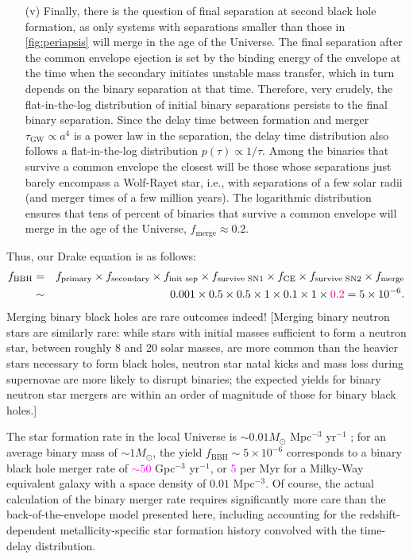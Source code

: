 \documentclass[iop,onecolumn]{revtex4}
\newcommand{\ilya}[1]{\textcolor{magenta}{#1}}
\begin{document}
\begin{enumerate}
\item[(v)]  Finally, there is the question of final separation at second black hole formation, as only systems with separations smaller than those in \autoref{fig:periapsis} will merge in the age of the Universe.  The final separation after the common envelope ejection is set by the binding energy of the envelope at the time when the secondary initiates unstable mass transfer, which in turn depends on the binary separation at that time.  Therefore, very crudely, the flat-in-the-log distribution of initial binary separations persists to the final binary separation.  Since the delay time between formation and merger $\tau_\textrm{GW} \propto a^4$ is a power law in the separation, the delay time distribution also follows a flat-in-the-log distribution $p(\tau) \propto 1/\tau$.  Among the binaries that survive a common envelope the closest will be those whose separations just barely encompass a Wolf-Rayet star, i.e., with separations of a few solar radii (and merger times of a few million years).  The logarithmic distribution ensures that tens of percent of binaries that survive a common envelope will merge in the age of the Universe, $f_\textrm{merge} \approx 0.2$.
\end{enumerate}

Thus, our Drake equation is as follows:
\begin{eqnarray}
f_\textrm{BBH} &=& f_\textrm{primary} \times f_\textrm{secondary} \times f_\textrm{init sep} \times f_\textrm{survive SN1} \times f_\textrm{CE} \times f_\textrm{survive SN2} \times f_\textrm{merge} \nonumber \\
 & \sim & 0.001 \times 0.5 \times 0.5 \times 1 \times 0.1 \times 1 \times \ilya{0.2} = 5 \times 10^{-6}.
\end{eqnarray}
Merging binary black holes are rare outcomes indeed!  [Merging binary neutron stars are similarly rare: while stars with initial masses sufficient to form a neutron star, between roughly 8 and 20 solar masses, are more common than the heavier stars necessary to form black holes, neutron star natal kicks and mass loss during supernovae are more likely to disrupt binaries; the expected yields for binary neutron star mergers are within an order of magnitude of those for binary black holes.]

The star formation rate in the local Universe is $\sim 0.01 M_\odot$ Mpc$^{-3}$ yr$^{-1}$ \citep{MadauDickinson:2014}; for an average binary mass of $\sim 1 M_\odot$, the yield $f_\textrm{BBH} \sim 5 \times 10^{-6}$ corresponds to a binary black hole merger rate of \ilya{$\sim 50$} Gpc$^{-3}$ yr$^{-1}$, or \ilya{5} per Myr for a Milky-Way equivalent galaxy with a space density of $0.01$ Mpc$^{-3}$.  Of course, the actual calculation of the binary merger rate requires significantly more care than the back-of-the-envelope model presented here, including accounting for the redshift-dependent metallicity-specific star formation history convolved with the time-delay distribution.  
\end{document}
